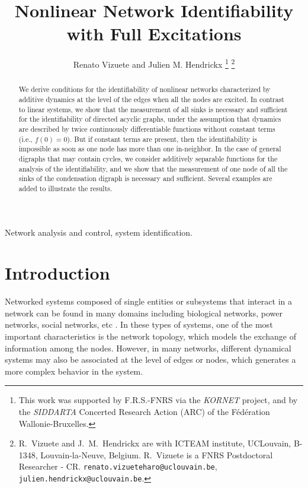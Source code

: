 \documentclass[letterpaper,10pt,journal]{IEEEtran}
\title{Nonlinear Network Identifiability \linebreak with Full Excitations
}
\author{Renato Vizuete and Julien M. Hendrickx
\thanks{This work was supported by F.R.S.-FNRS via the \emph{KORNET} project, and by the \emph{SIDDARTA} Concerted Research Action (ARC) 
of the Fédération Wallonie-Bruxelles.}
\thanks{R.~Vizuete and J.~M.~Hendrickx are with ICTEAM institute, UCLouvain, B-1348, Louvain-la-Neuve, Belgium. R.~Vizuete is a FNRS Postdoctoral Researcher - CR.
{\tt\small renato.vizueteharo@uclouvain.be},
{\tt\small julien.hendrickx@uclouvain.be}\protect.}
}
\begin{document}
\maketitle
\thispagestyle{empty}



\begin{abstract}
We derive conditions for the identifiability of nonlinear networks characterized by additive dynamics at the level of the edges when all the nodes are excited. In contrast to linear systems, we show that the measurement of all sinks is necessary and sufficient for the identifiability of directed acyclic graphs, under the assumption that dynamics are described by twice continuously differentiable functions without constant terms (i.e., $f(0)=0$). But if constant terms are present, then the identifiability is impossible as soon as one node has more than one in-neighbor. In the case of general digraphs that may contain cycles, we consider additively separable functions for the analysis of the identifiability, and we show that the measurement of one node of all the sinks of the condensation digraph is necessary and sufficient. Several examples are added to illustrate the results.
\end{abstract}


\begin{IEEEkeywords}
Network analysis and control, system identification.
\end{IEEEkeywords}


\section{Introduction}



Networked systems composed of single entities or subsystems that interact in a network can be found in many domains including biological networks, power networks, social networks, etc \cite{boccaletti2006complex,bullo2024lectures}. In these types of systems, one of the most important characteristics is the network topology, which models the exchange of information among the nodes. However, in many networks, different dynamical systems may also be associated at the level of edges or nodes, which generates a more complex behavior in the system. 
\end{document}
